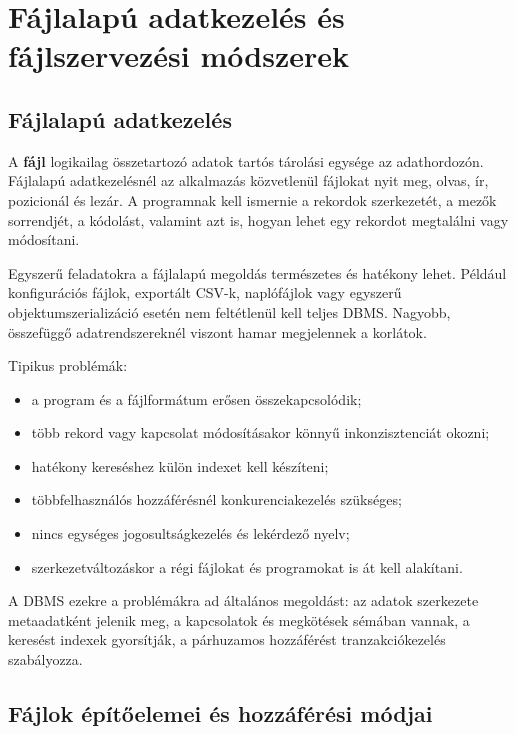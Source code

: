 \begin{center}

\end{center}

\section{Fájlalapú adatkezelés és fájlszervezési módszerek}

\subsection{Fájlalapú adatkezelés}

A \textbf{fájl} logikailag összetartozó adatok tartós tárolási egysége az adathordozón. Fájlalapú adatkezelésnél az alkalmazás közvetlenül fájlokat nyit meg, olvas, ír, pozicionál és lezár. A programnak kell ismernie a rekordok szerkezetét, a mezők sorrendjét, a kódolást, valamint azt is, hogyan lehet egy rekordot megtalálni vagy módosítani.

Egyszerű feladatokra a fájlalapú megoldás természetes és hatékony lehet. Például konfigurációs fájlok, exportált CSV-k, naplófájlok vagy egyszerű objektumszerializáció esetén nem feltétlenül kell teljes DBMS. Nagyobb, összefüggő adatrendszereknél viszont hamar megjelennek a korlátok.

Tipikus problémák:

\begin{itemize}
  \item a program és a fájlformátum erősen összekapcsolódik;
  \item több rekord vagy kapcsolat módosításakor könnyű inkonzisztenciát okozni;
  \item hatékony kereséshez külön indexet kell készíteni;
  \item többfelhasználós hozzáférésnél konkurenciakezelés szükséges;
  \item nincs egységes jogosultságkezelés és lekérdező nyelv;
  \item szerkezetváltozáskor a régi fájlokat és programokat is át kell alakítani.
\end{itemize}

A DBMS ezekre a problémákra ad általános megoldást: az adatok szerkezete metaadatként jelenik meg, a kapcsolatok és megkötések sémában vannak, a keresést indexek gyorsítják, a párhuzamos hozzáférést tranzakciókezelés szabályozza.

\subsection{Fájlok építőelemei és hozzáférési módjai}

